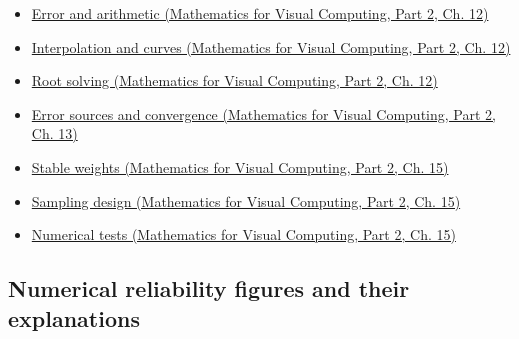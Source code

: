 \begin{itemize}
\tightlist
\item
  \href{../02-Mathematics-for-Visual-Computing-P02/main.pdf\#nameddest=02-foundations-ii-ch028-floating-point-answers-error-conditioning-stability-and-stable-arithmetic}{Error and arithmetic (Mathematics for Visual Computing, Part 2, Ch. 12)}
\item
  \href{../02-Mathematics-for-Visual-Computing-P02/main.pdf\#nameddest=02-foundations-ii-ch028-reconstructing-values-and-curves-between-samples}{Interpolation and curves (Mathematics for Visual Computing, Part 2, Ch. 12)}
\item
  \href{../02-Mathematics-for-Visual-Computing-P02/main.pdf\#nameddest=02-foundations-ii-ch028-finding-roots-with-guarantees-and-convergence-checks}{Root solving (Mathematics for Visual Computing, Part 2, Ch. 12)}
\item
  \href{../02-Mathematics-for-Visual-Computing-P02/main.pdf\#nameddest=02-foundations-ii-ch029-separate-discretization-truncation-and-roundoff-measure-convergence}{Error sources and convergence (Mathematics for Visual Computing, Part 2, Ch. 13)}
\item
  \href{../02-Mathematics-for-Visual-Computing-P02/main.pdf\#nameddest=02-foundations-ii-ch031-keep-probability-weights-stable-before-sampling}{Stable weights (Mathematics for Visual Computing, Part 2, Ch. 15)}
\item
  \href{../02-Mathematics-for-Visual-Computing-P02/main.pdf\#nameddest=02-foundations-ii-ch031-design-samples-without-replacement-stratified-and-low-discrepancy}{Sampling design (Mathematics for Visual Computing, Part 2, Ch. 15)}
\item
  \href{../02-Mathematics-for-Visual-Computing-P02/main.pdf\#nameddest=02-foundations-ii-ch031-test-numerical-methods-and-benchmark-reproducibly}{Numerical tests (Mathematics for Visual Computing, Part 2, Ch. 15)}
\end{itemize}

\subsection{Numerical reliability figures and their explanations}\label{appendix-cb5af353ef77-numerical-reliability-figures-and-their-explanations}

\hypertarget{appendix-cb5af353ef77-numerical-reliability-figures-and-their-explanations}{}


